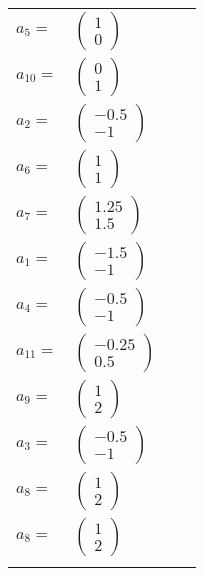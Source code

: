 \documentclass[1p]{elsarticle_modified}
\theoremstyle{definition}
\begin{document}
\begin{tabular}{m{7pt} m{180pt} m{7pt} m{180pt} }
\flushright $a_{5}=$&$\begin{pmatrix}1\\0\end{pmatrix}$ \\
\flushright $a_{10}=$&$\begin{pmatrix}0\\1\end{pmatrix}$ \\
\flushright $a_{2}=$&$\begin{pmatrix}-0.5\\-1\end{pmatrix}$ \\
\flushright $a_{6}=$&$\begin{pmatrix}1\\1\end{pmatrix}$ \\
\flushright $a_{7}=$&$\begin{pmatrix}1.25\\1.5\end{pmatrix}$ \\
\flushright $a_{1}=$&$\begin{pmatrix}-1.5\\-1\end{pmatrix}$ \\
\flushright $a_{4}=$&$\begin{pmatrix}-0.5\\-1\end{pmatrix}$ \\
\flushright $a_{11}=$&$\begin{pmatrix}-0.25\\0.5\end{pmatrix}$ \\
\flushright $a_{9}=$&$\begin{pmatrix}1\\2\end{pmatrix}$ \\
\flushright $a_{3}=$&$\begin{pmatrix}-0.5\\-1\end{pmatrix}$ \\
\flushright $a_{8}=$&$\begin{pmatrix}1\\2\end{pmatrix}$\\ \flushright $a_{8}=$&$\begin{pmatrix}1\\2\end{pmatrix}$\\&\end{tabular}
\end{document}
